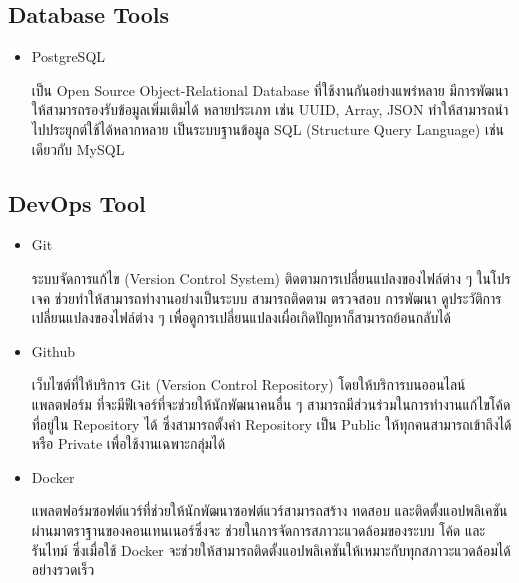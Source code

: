 \documentclass[12pt,oneside,openright,a4paper]{cpe-thai-project}
\begin{document}
  \subsection{Database Tools}
    \begin{itemize}
      \item PostgreSQL
      
      \hspace{1cm}เป็น Open Source Object-Relational Database ที่ใช้งานกันอย่างแพร่หลาย มีการพัฒนาให้สามารถรองรับข้อมูลเพิ่มเติมได้
      หลายประเภท เช่น UUID, Array, JSON ทำให้สามารถนำไปประยุุกต์ใช้ได้หลากหลาย เป็นระบบฐานข้อมูล SQL (Structure Query Language)
      เช่นเดียวกับ MySQL  \cite{postgresql}
    \end{itemize}
  \subsection{DevOps Tool}
    \begin{itemize}
      \item Git
      
      \hspace{1cm}ระบบจัดการแก้ไข (Version Control System) ติดตามการเปลี่ยนแปลงของไฟล์ต่าง ๆ ในโปรเจค ช่วยทำให้สามารถทำงานอย่างเป็นระบบ 
      สามารถติดตาม ตรวจสอบ การพัฒนา ดูประวัติการเปลี่ยนแปลงของไฟล์ต่าง ๆ เพื่อดูการเปลี่ยนแปลงเผื่อเกิดปัญหาก็สามารถย้อนกลับได้ \cite{git}

      \item Github
      
      \hspace{1cm}เว็บไซต์ที่ให้บริการ Git (Version Control Repository) โดยให้บริการบนออนไลน์แพลตฟอร์ม 
      ที่จะมีฟีเจอร์ที่จะช่วยให้นักพัฒนาคนอื่น ๆ สามารถมีส่วนร่วมในการทำงานแก้ไขโค้ดที่อยู่ใน Repository ได้
      ซึ่งสามารถตั้งค่า Repository เป็น Public ให้ทุกคนสามารถเข้าถึงได้ หรือ Private เพื่อใช้งานเฉพาะกลุ่มได้ \cite{github}

      \item Docker
      
      \hspace{1cm}แพลตฟอร์มซอฟต์แวร์ที่ช่วยให้นักพัฒนาซอฟต์แวร์สามารถสร้าง ทดสอบ และติดตั้งแอปพลิเคชันผ่านมาตราฐานของคอนเทนเนอร์ซึ่งจะ
      ช่วยในการจัดการสภาวะแวดล้อมของระบบ โค้ด และรันไทม์ ซึ่งเมื่อใช้ Docker จะช่วยให้สามารถติดตั้งแอปพลิเคชันให้เหมาะกับทุกสภาวะแวดล้อมได้อย่างรวดเร็ว \cite{docker} 
    \end{itemize}
\end{document}
